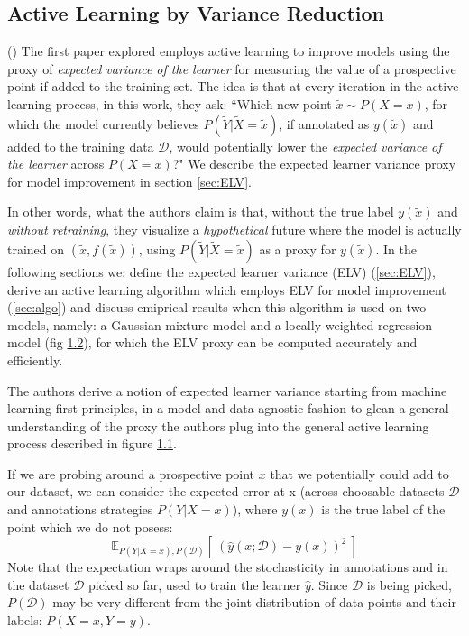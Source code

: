 \documentclass[
  letterpaper,
  DIV=11,
  numbers=noendperiod,
  oneside]{scrreprt}
\theoremstyle{remark}
\begin{document}
\subsection{Active Learning by Variance
Reduction}\label{active-learning-by-variance-reduction}

() The
first paper explored employs active learning to improve models using the
proxy of \emph{expected variance of the learner} for measuring the value
of a prospective point if added to the training set. The idea is that at
every iteration in the active learning process, in this work, they ask:
``Which new point \(\tilde{x} \sim P(X=x)\), for which the model
currently believes \(P(\tilde{Y}|\tilde{X}=\tilde{x})\), if annotated as
\(y(\tilde{x})\) and added to the training data \(\mathcal{D}\), would
potentially lower the \emph{expected variance of the learner} across
\(P(X=x)\)?" We describe the expected learner variance proxy for model
improvement in section \hyperref[sec:ELV]{{[}sec:ELV{]}}.

In other words, what the authors claim is that, without the true label
\(y(\tilde{x})\) and \emph{without retraining}, they visualize a
\emph{hypothetical} future where the model is actually trained on
\((\tilde{x}, f(\tilde{x}))\), using
\(P(\tilde{Y}|\tilde{X}=\tilde{x})\) as a proxy for \(y(\tilde{x})\). In
the following sections we: define the expected learner variance (ELV)
(\hyperref[sec:ELV]{{[}sec:ELV{]}}), derive an active learning algorithm
which employs ELV for model improvement
(\hyperref[sec:algo]{{[}sec:algo{]}}) and discuss emiprical results when
this algorithm is used on two models, namely: a Gaussian mixture model
and a locally-weighted regression model (fig
\hyperref[fig:two_models]{1.2}), for which the ELV proxy can be computed
accurately and efficiently.

The authors derive a notion of expected learner variance starting from
machine learning first principles, in a model and data-agnostic fashion
to glean a general understanding of the proxy the authors plug into the
general active learning process described in figure
\hyperref[fig:schema]{1.1}.

If we are probing around a prospective point \(x\) that we potentially
could add to our dataset, we can consider the expected error at x
(across choosable datasets \(\mathcal{D}\) and annotations strategies
\(P(Y|X=x)\)), where \(y(x)\) is the true label of the point which we do
not posess:
\[\mathbb{E} _{P(Y|X=x), P(\mathcal{D})}[\ (\hat{y}(x; \mathcal{D}) - y(x))^2\ ]\]
Note that the expectation wraps around the stochasticity in annotations
and in the dataset \(\mathcal{D}\) picked so far, used to train the
learner \(\hat{y}\). Since \(\mathcal{D}\) is being picked,
\(P(\mathcal{D})\) may be very different from the joint distribution of
data points and their labels: \(P(X=x,Y=y)\).
\end{document}

